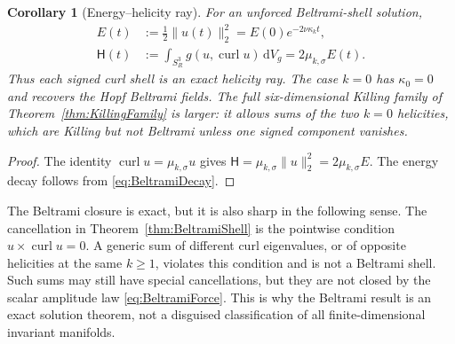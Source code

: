 \documentclass[aps,prd,reprint,superscriptaddress,nofootinbib,floatfix]{revtex4-2}
\newtheorem{corollary}[theorem]{Corollary}
\theoremstyle{definition}
\theoremstyle{remark}
\newcommand{\dd}{\mathrm{d}}
\begin{document}
\begin{corollary}[Energy--helicity ray]\label{cor:BeltramiHelicity}
	For an unforced Beltrami-shell solution,
	\begin{align}
		E(t)         & :=\frac12\|u(t)\|_2^2
		=E(0)e^{-2\nu\kappa_k t},                                        \\
		\mathsf H(t) & :=\int_{S^3_R} g(u,\operatorname{curl}u)\,\dd V_g
		=2\mu_{k,\sigma}E(t).
		\label{eq:helicityray}
	\end{align}
	Thus each signed curl shell is an exact helicity ray.  The case $k=0$ has
	$\kappa_0=0$ and recovers the Hopf Beltrami fields.  The full six-dimensional
	Killing family of Theorem~\ref{thm:KillingFamily} is larger: it allows sums of
	the two $k=0$ helicities, which are Killing but not Beltrami unless one signed
	component vanishes.
\end{corollary}

\begin{proof}
	The identity $\operatorname{curl}u=\mu_{k,\sigma}u$ gives
	$\mathsf H=\mu_{k,\sigma}\|u\|_2^2=2\mu_{k,\sigma}E$.  The energy decay follows
	from \eqref{eq:BeltramiDecay}.
\end{proof}

The Beltrami closure is exact, but it is also sharp in the following sense.  The
cancellation in Theorem~\ref{thm:BeltramiShell} is the pointwise condition
$u\times\operatorname{curl}u=0$.  A generic sum of different curl eigenvalues, or
of opposite helicities at the same $k\ge1$, violates this condition and is not a
Beltrami shell.  Such sums may still have special cancellations, but they are not
closed by the scalar amplitude law \eqref{eq:BeltramiForce}.  This is why the
Beltrami result is an exact solution theorem, not a disguised classification of
all finite-dimensional invariant manifolds.
\end{document}
